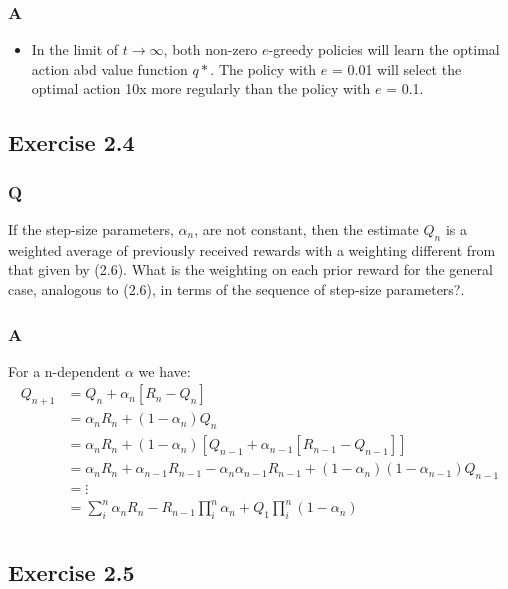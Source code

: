 \subsubsection*{A}
\begin{itemize}
	\item In the limit of \(t \rightarrow \infty\), both non-zero \(e\)-greedy policies will learn the optimal action abd value function \(q*\). The policy with \(e\) = 0.01 will select the optimal action 10x more regularly than the policy with \(e\) = 0.1.
\end{itemize}
\subsection{Exercise 2.4}
\subsubsection*{Q}
If the step-size parameters, \(\alpha_n\), are not constant, then the estimate \(Q_n\) is a weighted average of previously received rewards with a weighting different from that given by (2.6). What is the weighting on each prior reward for the general case, analogous to (2.6), in terms of the sequence of step-size parameters?.

\subsubsection*{A}
For a n-dependent \(\alpha\) we have:
\begin{align}
	Q_{n+1} &= Q_n +\alpha_n \left[R_n - Q_n\right] \nonumber \\
	&= \alpha_n R_n + (1-\alpha_n) Q_n\nonumber \\
	&= \alpha_n R_n + (1-\alpha_n) \left[Q_{n-1} + \alpha_{n-1} \left[R_{n-1} - Q_{n-1} \right]\right]\nonumber \\
	&= \alpha_n R_n + \alpha_{n-1} R_{n-1} - \alpha_n \alpha_{n-1} R_{n-1} + (1-\alpha_n)(1-\alpha_{n-1}) Q_{n-1} \nonumber \\
	&= \vdots \nonumber \\
	&= \sum_{i}^{n} \alpha_n R_n - R_{n-1} \prod_{i}^{n} \alpha_n + Q_{1} \prod_{i}^{n}(1-\alpha_n) \\
\end{align}

\subsection{Exercise 2.5}
